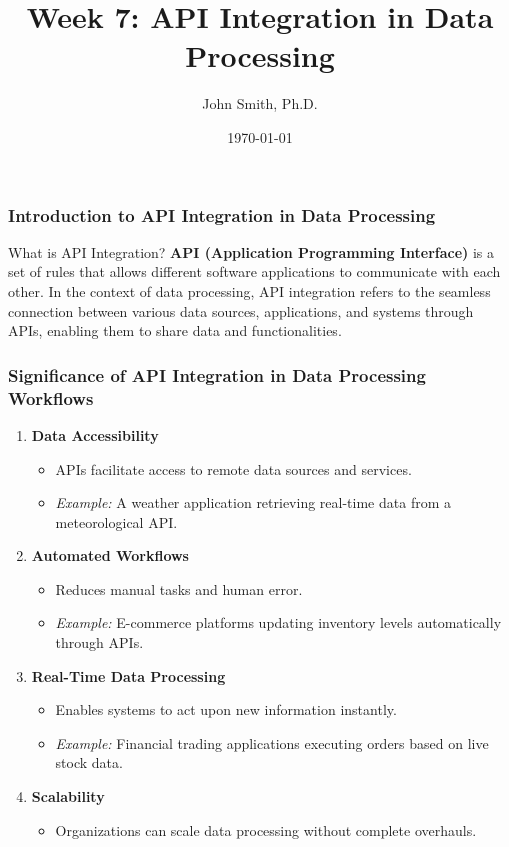\documentclass[aspectratio=169]{beamer}
\title[Week 7: API Integration]{Week 7: API Integration in Data Processing}
\author[J. Smith]{John Smith, Ph.D.}
\institute[University Name]{
  Department of Computer Science\\
  University Name\\
  \vspace{0.3cm}
  Email: email@university.edu\\
  Website: www.university.edu
}
\date{\today}
\begin{document}
\frame{\titlepage}

\begin{frame}[fragile]
    \frametitle{Introduction to API Integration in Data Processing}
    \begin{block}{What is API Integration?}
        \textbf{API (Application Programming Interface)} is a set of rules that allows different software applications to communicate with each other. In the context of data processing, API integration refers to the seamless connection between various data sources, applications, and systems through APIs, enabling them to share data and functionalities.
    \end{block}
\end{frame}

\begin{frame}[fragile]
    \frametitle{Significance of API Integration in Data Processing Workflows}
    \begin{enumerate}
        \item \textbf{Data Accessibility}
            \begin{itemize}
                \item APIs facilitate access to remote data sources and services.
                \item \textit{Example:} A weather application retrieving real-time data from a meteorological API.
            \end{itemize}
        \item \textbf{Automated Workflows}
            \begin{itemize}
                \item Reduces manual tasks and human error.
                \item \textit{Example:} E-commerce platforms updating inventory levels automatically through APIs.
            \end{itemize}
        \item \textbf{Real-Time Data Processing}
            \begin{itemize}
                \item Enables systems to act upon new information instantly.
                \item \textit{Example:} Financial trading applications executing orders based on live stock data.
            \end{itemize}
        \item \textbf{Scalability}
            \begin{itemize}
                \item Organizations can scale data processing without complete overhauls.

\end{itemize}
\end{enumerate}
\end{frame}
\end{document}
